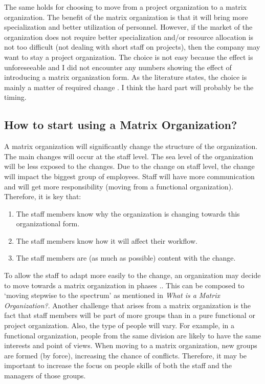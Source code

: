 The same holds for choosing to move from a project organization to a matrix organization. The benefit of the matrix organization is that it will bring more specialization and better utilization of personnel. However, if the market of the organization does not require better specialization and/or resource allocation is not too difficult (not dealing with short staff on projects), then the company may want to stay a project organization.
The choice is not easy because the effect is unforeseeable and I did not encounter any numbers showing the effect of introducing a matrix organization form. As the literature states, the choice is mainly a matter of required change \autocite[70]{MEE196470}. I think the hard part will probably be the timing.

\subsection*{How to start using a Matrix Organization?}
A matrix organization will significantly change the structure of the organization. The main changes will occur at the staff level. The sea level of the organization will be less exposed to the changes. \autocite[113]{KNIGHT}
Due to the change on staff level, the change will impact the biggest group of employees. Staff will have more communication and will get more responsibility (moving from a functional organization). Therefore, it is key that:

\begin{enumerate}
\item The staff members know why the organization is changing towards this organizational form.
\item The staff members know how it will affect their workflow.
\item The staff members are (as much as possible) content with the change.
\end{enumerate}

To allow the staff to adapt more easily to the change, an organization may decide to move towards a matrix organization in phases \autocite[39]{Galbraith197129}.. This can be composed to `moving stepwise to the spectrum' as mentioned in \textit{What is a Matrix Organization?}.
Another challenge that arises from a matrix organization is the fact that staff members will be part of more groups than in a pure functional or project organization. Also, the type of people will vary. For example, in a functional organization, people from the same division are likely to have the same interests and point of views. When moving to a matrix organization, new groups are formed (by force), increasing the chance of conflicts. Therefore, it may be important to increase the focus on people skills of both the staff and the managers of those groups.

